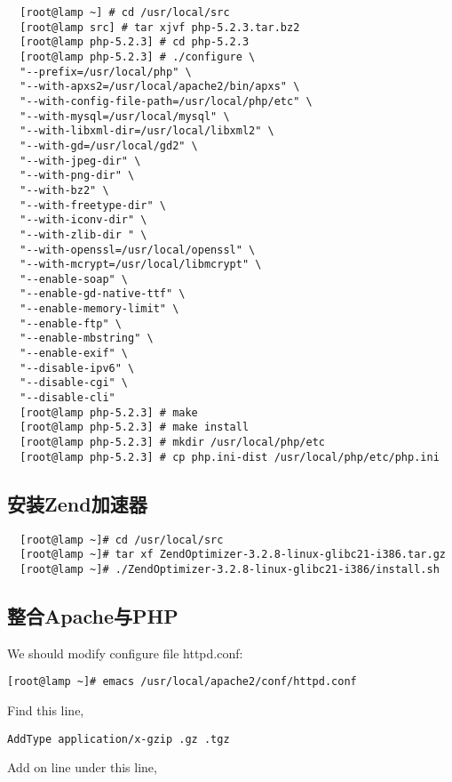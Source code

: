 \small{
\begin{verbatim}
  [root@lamp ~] # cd /usr/local/src
  [root@lamp src] # tar xjvf php-5.2.3.tar.bz2
  [root@lamp php-5.2.3] # cd php-5.2.3
  [root@lamp php-5.2.3] # ./configure \
  "--prefix=/usr/local/php" \
  "--with-apxs2=/usr/local/apache2/bin/apxs" \
  "--with-config-file-path=/usr/local/php/etc" \
  "--with-mysql=/usr/local/mysql" \
  "--with-libxml-dir=/usr/local/libxml2" \
  "--with-gd=/usr/local/gd2" \
  "--with-jpeg-dir" \
  "--with-png-dir" \
  "--with-bz2" \
  "--with-freetype-dir" \
  "--with-iconv-dir" \
  "--with-zlib-dir " \
  "--with-openssl=/usr/local/openssl" \
  "--with-mcrypt=/usr/local/libmcrypt" \
  "--enable-soap" \
  "--enable-gd-native-ttf" \
  "--enable-memory-limit" \
  "--enable-ftp" \
  "--enable-mbstring" \
  "--enable-exif" \
  "--disable-ipv6" \
  "--disable-cgi" \
  "--disable-cli"
  [root@lamp php-5.2.3] # make
  [root@lamp php-5.2.3] # make install
  [root@lamp php-5.2.3] # mkdir /usr/local/php/etc
  [root@lamp php-5.2.3] # cp php.ini-dist /usr/local/php/etc/php.ini
\end{verbatim}
}
\normalsize

\subsection{安装Zend加速器}

\small{
\begin{verbatim}
  [root@lamp ~]# cd /usr/local/src
  [root@lamp ~]# tar xf ZendOptimizer-3.2.8-linux-glibc21-i386.tar.gz
  [root@lamp ~]# ./ZendOptimizer-3.2.8-linux-glibc21-i386/install.sh
\end{verbatim}
}
\normalsize

\subsection{整合Apache与PHP}

We should modify configure file httpd.conf:

\small{
\begin{verbatim}
[root@lamp ~]# emacs /usr/local/apache2/conf/httpd.conf
\end{verbatim}
}
\normalsize

Find this line,

\small{
\begin{verbatim}
AddType application/x-gzip .gz .tgz
\end{verbatim}
}
\normalsize

Add on line under this line,

